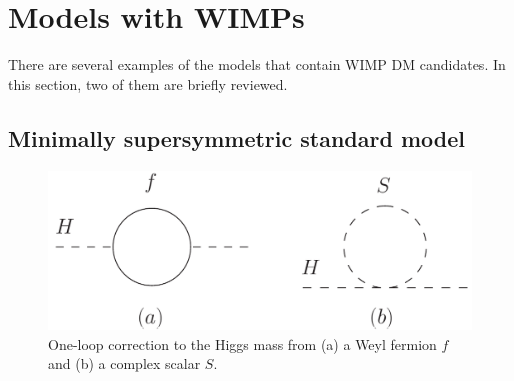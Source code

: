 \documentclass[12pt,twoside,book]{article}
\begin{document}
\section{Models with WIMPs}
\setcounter{equation}{0}

\vskip 0.1in

There are several examples of the models that contain WIMP DM
candidates.  In this section, two of them  are briefly
reviewed.  

\subsection{Minimally supersymmetric standard model}

\begin{figure}[b]
  \centering
  \includegraphics[width=0.6\hsize]{Higgs_mass.pdf}
  \caption{One-loop correction to the Higgs mass from (a) a Weyl fermion $f$ and (b) a complex scalar $S$.}
  \label{fig:Higgs_mass}
\end{figure}
\end{document}
